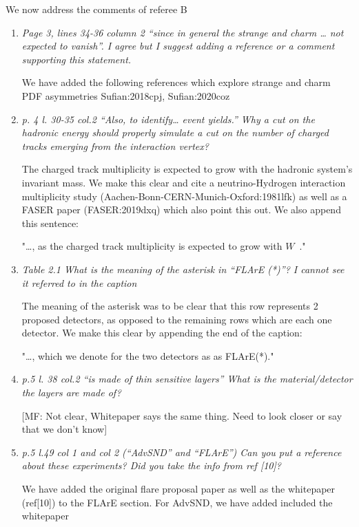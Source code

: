 \documentclass[11pt,a4paper]{article}
\begin{document}
\noindent
We now address the comments of referee B

\begin{enumerate}
\item{\it Page 3, lines 34-36 column 2 “since in general the strange and charm … not expected to vanish”. I agree but I suggest adding a reference or a comment supporting this statement. }

We have added the following references which explore strange and charm PDF asymmetries Sufian:2018cpj, Sufian:2020coz

\item{\it p. 4 l. 30-35 col.2 “Also, to identify… event yields.” Why a cut on the hadronic energy should properly simulate a cut on the number of charged tracks emerging from the interaction vertex?}

The charged track multiplicity is expected to grow with the hadronic system’s invariant mass. We make this clear and cite a neutrino-Hydrogen interaction multiplicity study (Aachen-Bonn-CERN-Munich-Oxford:1981lfk) as well as a FASER paper (FASER:2019dxq) which also point this out. We also append this sentence:

"…, as the charged track multiplicity is expected to grow with $W$~\cite{Aachen-Bonn-CERN-Munich-Oxford:1981lfk,FASER:2019dxq}."


\item{\it Table 2.1 What is the meaning of the asterisk in “FLArE (*)”? I cannot see it referred to in the caption} 

The meaning of the asterisk was to be clear that this row represents 2 proposed detectors, as opposed to the remaining rows which are each one detector. We make this clear by appending the end of the caption:

"…, which we denote for the two detectors as as FLArE(*)."

\item{\it  p.5 l. 38 col.2 “is made of thin sensitive layers” What is the material/detector the layers are made of?}

{\color{red} [MF: Not clear, Whitepaper says the same thing. Need to look closer or say that we don't know]}

\item{\it  p.5 l.49 col 1 and col 2 (“AdvSND” and “FLArE”) Can you put a reference about these experiments? Did you take the info from ref [10]?}

We have added the original flare proposal paper as well as the whitepaper (ref[10]) to the FLArE section. For AdvSND, we have added included the whitepaper  


\end{enumerate}
\end{document}
